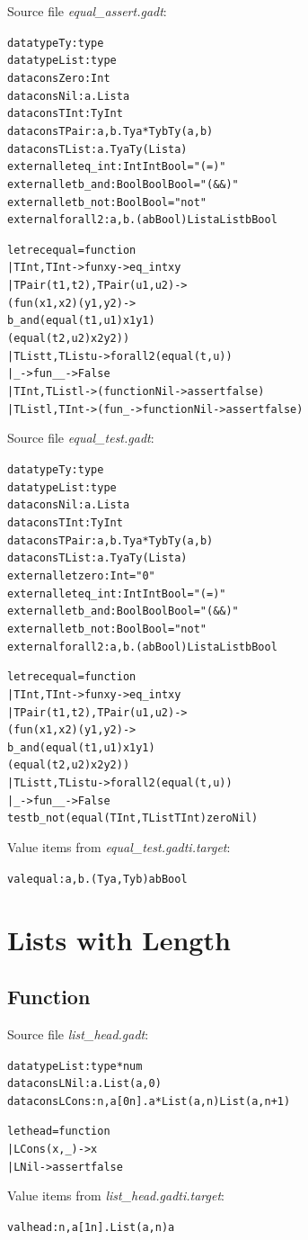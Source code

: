\documentclass{article}
\newcommand{\tmem}[1]{{\em #1\/}}
\newcommand{\tmverbatim}[1]{{\ttfamily{#1}}}
\newenvironment{tmcode}[1][]{\begin{alltt}}{\end{alltt}}
\begin{document}
Source file {\tmem{equal\_assert.gadt}}:
\begin{tmcode}
datatype Ty : type
datatype List : type
datacons Zero : Int
datacons Nil : a. List a
datacons TInt : Ty Int
datacons TPair : a, b. Ty a * Ty b  Ty (a, b)
datacons TList : a. Ty a  Ty (List a)
external let eq_int : Int  Int  Bool = "(=)"
external let b_and : Bool  Bool  Bool = "(&&)"
external let b_not : Bool  Bool = "not"
external forall2 : a, b. (a  b  Bool)  List a  List b  Bool

let rec equal = function
  | TInt, TInt -> fun x y -> eq_int x y
  | TPair (t1, t2), TPair (u1, u2) ->  
    (fun (x1, x2) (y1, y2) ->
        b_and (equal (t1, u1) x1 y1)
              (equal (t2, u2) x2 y2))
  | TList t, TList u -> forall2 (equal (t, u))
  | _ -> fun _ _ -> False
  | TInt, TList l -> (function Nil -> assert false)
  | TList l, TInt -> (fun _ -> function Nil -> assert false)
\end{tmcode}
Source file {\tmem{equal\_test.gadt}}:
\begin{tmcode}
datatype Ty : type
datatype List : type
datacons Nil : a. List a
datacons TInt : Ty Int
datacons TPair : a, b. Ty a * Ty b  Ty (a, b)
datacons TList : a. Ty a  Ty (List a)
external let zero : Int = "0"
external let eq_int : Int  Int  Bool = "(=)"
external let b_and : Bool  Bool  Bool = "(&&)"
external let b_not : Bool  Bool = "not"
external forall2 : a, b. (a  b  Bool)  List a  List b  Bool

let rec equal = function
  | TInt, TInt -> fun x y -> eq_int x y
  | TPair (t1, t2), TPair (u1, u2) ->  
    (fun (x1, x2) (y1, y2) ->
        b_and (equal (t1, u1) x1 y1)
              (equal (t2, u2) x2 y2))
  | TList t, TList u -> forall2 (equal (t, u))
  | _ -> fun _ _ -> False
test b_not (equal (TInt, TList TInt) zero Nil)
\end{tmcode}
Value items from {\tmem{equal\_test.gadti.target}}:
\begin{tmcode}
val equal : a, b. (Ty a, Ty b)  a  b  Bool
\end{tmcode}

\section{Lists with Length}

\subsection{Function \tmverbatim{head}}

Source file {\tmem{list\_head.gadt}}:
\begin{tmcode}
datatype List : type * num
datacons LNil : a. List(a, 0)
datacons LCons : n, a [0n]. a * List(a, n)  List(a, n+1)

let head = function
  | LCons (x, _) -> x
  | LNil -> assert false
\end{tmcode}
Value items from {\tmem{list\_head.gadti.target}}:
\begin{tmcode}
val head : n, a[1  n]. List (a, n)  a
\end{tmcode}
\end{document}
